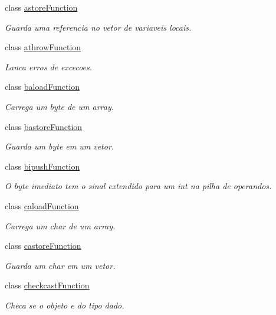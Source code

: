 \begin{DoxyCompactItemize}
class \hyperlink{classInstruction_1_1astoreFunction}{astore\+Function}
\begin{DoxyCompactList}\small\item\em Guarda uma referencia no vetor de variaveis locais. \end{DoxyCompactList}\item 
class \hyperlink{classInstruction_1_1athrowFunction}{athrow\+Function}
\begin{DoxyCompactList}\small\item\em Lanca erros de excecoes. \end{DoxyCompactList}\item 
class \hyperlink{classInstruction_1_1baloadFunction}{baload\+Function}
\begin{DoxyCompactList}\small\item\em Carrega um byte de um array. \end{DoxyCompactList}\item 
class \hyperlink{classInstruction_1_1bastoreFunction}{bastore\+Function}
\begin{DoxyCompactList}\small\item\em Guarda um byte em um vetor. \end{DoxyCompactList}\item 
class \hyperlink{classInstruction_1_1bipushFunction}{bipush\+Function}
\begin{DoxyCompactList}\small\item\em O byte imediato tem o sinal extendido para um int na pilha de operandos. \end{DoxyCompactList}\item 
class \hyperlink{classInstruction_1_1caloadFunction}{caload\+Function}
\begin{DoxyCompactList}\small\item\em Carrega um char de um array. \end{DoxyCompactList}\item 
class \hyperlink{classInstruction_1_1castoreFunction}{castore\+Function}
\begin{DoxyCompactList}\small\item\em Guarda um char em um vetor. \end{DoxyCompactList}\item 
class \hyperlink{classInstruction_1_1checkcastFunction}{checkcast\+Function}
\begin{DoxyCompactList}\small\item\em Checa se o objeto e do tipo dado. \end{DoxyCompactList}\item 

\end{DoxyCompactItemize}
